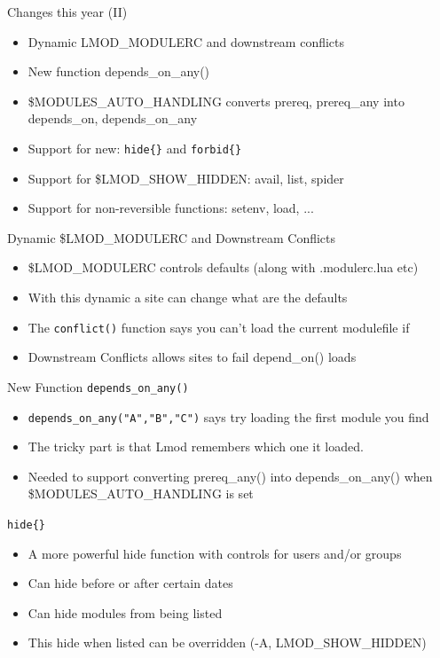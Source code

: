 \documentclass{beamer}
\begin{document}
\begin{frame}{Changes this year (II)}
  \begin{itemize}
    \item Dynamic LMOD\_MODULERC and downstream conflicts
    \item New function depends\_on\_any()
    \item \$MODULES\_AUTO\_HANDLING converts prereq, prereq\_any into
      depends\_on, depends\_on\_any
    \item Support for new: \texttt{hide\{\}} and \texttt{forbid\{\}}
    \item Support for \$LMOD\_SHOW\_HIDDEN: avail, list, spider
    \item Support for non-reversible functions: setenv, load, ...
  \end{itemize}
\end{frame}

\begin{frame}{Dynamic \$LMOD\_MODULERC and Downstream Conflicts}
  \begin{itemize}
    \item \$LMOD\_MODULERC controls defaults (along with .modulerc.lua etc)
    \item With this dynamic a site can change what are the defaults
    \item The \texttt{conflict()} function says you can't load the
      current modulefile if 
    \item Downstream Conflicts allows sites to fail depend\_on() loads 
  \end{itemize}
\end{frame}

\begin{frame}{New Function \texttt{depends\_on\_any()}}
  \begin{itemize}
    \item \texttt{depends\_on\_any("A","B","C")} says try loading the
      first module you find
    \item The tricky part is that Lmod remembers which one it loaded.
    \item Needed to support converting prereq\_any() into
      depends\_on\_any() when \$MODULES\_AUTO\_HANDLING is set
  \end{itemize}
\end{frame}

\begin{frame}{\texttt{hide\{\}}}
  \begin{itemize}
    \item A more powerful hide function with controls for users and/or
      groups
    \item Can hide before or after certain dates
    \item Can hide modules from being listed
    \item This hide when listed can be overridden (-A, LMOD\_SHOW\_HIDDEN)
  \end{itemize}
\end{frame}
\end{document}
